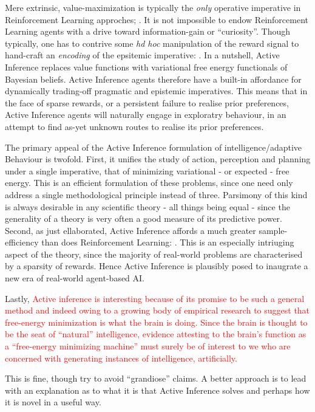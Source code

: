 \documentclass[onecolumn]{IEEEtran}
\begin{document}
Mere extrinsic, value-maximization is typically the \textit{only} operative imperative in Reinforcement Learning approches; \textcite{Reinforcement-Learning-An-Introduction}. It is not impossible to endow Reinforcement Learning agents with a drive toward information-gain or ``curiosity''. Though typically, one has to contrive some \textit{hd hoc} manipulation of the reward signal to hand-craft an \textit{encoding} of the epsitemic imperative: \textcite{Curiosity-Driven-RL}. In a nutshell, Active Inference replaces value functions with variational free energy functionals of Bayesian beliefs. Active Inference agents therefore have a built-in affordance for dynamically trading-off pragmatic and epistemic imperatives. This means that in the face of sparse rewards, or a persistent failure to realise prior preferences, Active Inference agents will naturally engage in exploratry behaviour, in an attempt to find as-yet unknown routes to realise its prior preferences. 

The primary appeal of the Active Inference formulation of intelligence/adaptive Behaviour is twofold. First, it unifies the study of action, perception and planning under a single imperative, that of minimizing variational - or expected - free energy. This is an efficient formulation of these problems, since one need only address a single methodological principle instead of three. Parsimony of this kind is always desirable in any scientific theory - all things being equal - since the generality of a theory is very often a good measure of its predictive power. Second, as just ellaborated, Active Inference affords a much greater sample-efficiency than does Reinforcement Learning: \textcite{Scaling-AIF}. This is an especially intriuging aspect of the theory, since the majority of real-world problems are characterised by a sparsity of rewards. Hence Active Inference is plausibly posed to inaugrate a new era of real-world agent-based AI.

Lastly, \textcolor{red}{Active inference is interesting because of its promise to be such a general method and indeed owing to a growing body of empirical research to suggest that free-energy minimization is what the brain is doing. Since the brain is thought to be the seat of ``natural'' intelligence, evidence attesting to the brain's function as a ``free-energy minimizing machine'' must surely be of interest to we who are concerned with generating instances of intelligence, artificially.}

This is fine, though try to avoid ``grandiose'' claims. A better approach is to lead with an explanation as to what it is that Active Inference solves and perhaps how it is novel in a useful way. 
\end{document}
